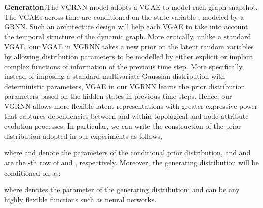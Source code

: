 \documentclass{article}
\begin{document}
\noindent \textbf{Generation.}\quad The VGRNN model adopts a VGAE to model each graph snapshot. The VGAEs across time are conditioned on the state variable , modeled by a GRNN.
Such an architecture design will help each VGAE to take into account the temporal structure of the dynamic graph. 
More critically, unlike a standard VGAE, our VGAE in VGRNN takes a new prior on the latent random variables by allowing distribution parameters to be modelled by either explicit or implicit complex functions of information of the previous time step. More specifically, instead of imposing a standard multivariate Gaussian distribution with deterministic parameters, VGAE in our VGRNN learns the prior distribution parameters based on the hidden states in previous time steps. 
Hence, our VGRNN allows more flexible latent representations with greater expressive power that captures dependencies between and within topological and node attribute evolution processes. In particular, we can write the construction of the prior distribution adopted in our experiments as follows,

where  and  denote the parameters of the conditional prior distribution, and  and  are the -th row of  and , respectively. Moreover, the generating distribution will be conditioned on  as:

where  denotes the parameter of the generating distribution;    and  can be
any highly flexible functions such as neural networks.
\end{document}
